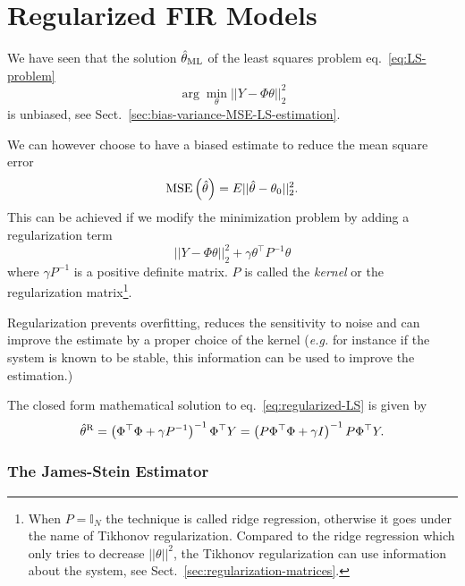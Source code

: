 \chapter{Regularized FIR Models}
\label{chap:regularised-FIR-models}

We have seen that the solution $\hat{\theta}_\textrm{ML}$ of the least squares problem eq.~\eqref{eq:LS-problem}
\begin{equation*}
  \arg\min_\theta ||Y-\Phi \theta||_2^2
\end{equation*}
is unbiased, see Sect.~\ref{sec:bias-variance-MSE-LS-estimation}.

We can however choose to have a biased estimate to reduce the mean square error
\begin{equation*}
  \textrm{MSE}\left(\hat{\theta}\right) = E{||\hat{\theta}-\theta_0||_2^2}.
\end{equation*}
This can be achieved if we modify the minimization problem by adding a regularization term
\begin{equation}
  \label{eq:regularized-LS}
  ||Y-\Phi \theta||_2^2 + \gamma \theta^\top P^{-1}\theta
\end{equation}
where $\gamma P^{-1}$ is a positive definite matrix. $P$ is called the \emph{kernel} or the regularization matrix\footnote{When $P=\mathbb{I}_N$ the technique is called ridge regression, otherwise it goes under the name of Tikhonov regularization. Compared to the ridge regression which only tries to decrease $||\theta||^2$, the Tikhonov regularization can use information about the system, see Sect.~\ref{sec:regularization-matrices}.}.

Regularization prevents overfitting, reduces the sensitivity to noise and can improve the estimate by a proper choice of the kernel (\textit{e.g.} for instance if the system is known to be stable, this information can be used to improve the estimation.)


The closed form mathematical solution to eq.~\eqref{eq:regularized-LS} is given by
\begin{equation}
  \label{eq:regularized-LS-solution}
  \hat{\theta}^\textrm{R} = \left(\Phi^\top\Phi + \gamma P^{-1}\right)^{-1}\Phi^\top Y = \left(P\Phi^\top\Phi + \gamma I \right)^{-1}P\Phi^\top Y.
\end{equation}

\subsection{The James-Stein Estimator}
\label{sec:james-stein-estimator}

